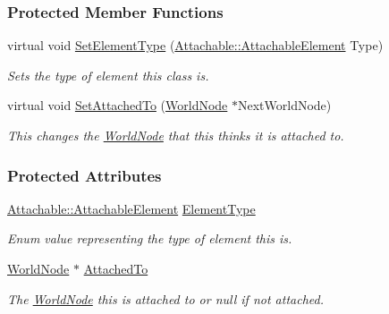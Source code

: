 \subsubsection*{Protected Member Functions}
\begin{DoxyCompactItemize}
\item 
virtual void \hyperlink{classphys_1_1Attachable_a74361315eba9e4f0ce288518c92541fa}{SetElementType} (\hyperlink{classphys_1_1Attachable_acd1fca033e7cc0bb3024a92d466d213a}{Attachable::AttachableElement} Type)
\begin{DoxyCompactList}\small\item\em Sets the type of element this class is. \item\end{DoxyCompactList}\item 
virtual void \hyperlink{classphys_1_1Attachable_a262c21d83f7d5a1bc96037fa59b7faaf}{SetAttachedTo} (\hyperlink{classphys_1_1WorldNode}{WorldNode} $\ast$NextWorldNode)
\begin{DoxyCompactList}\small\item\em This changes the \hyperlink{classphys_1_1WorldNode}{WorldNode} that this thinks it is attached to. \item\end{DoxyCompactList}\end{DoxyCompactItemize}
\subsubsection*{Protected Attributes}
\begin{DoxyCompactItemize}
\item 
\hyperlink{classphys_1_1Attachable_acd1fca033e7cc0bb3024a92d466d213a}{Attachable::AttachableElement} \hyperlink{classphys_1_1Attachable_af574d5f08a304c6e0ae002bb2fc057c7}{ElementType}
\begin{DoxyCompactList}\small\item\em Enum value representing the type of element this is. \item\end{DoxyCompactList}\item 
\hypertarget{classphys_1_1Attachable_af1009b5b9cfee1015079e8439182265e}{
\hyperlink{classphys_1_1WorldNode}{WorldNode} $\ast$ \hyperlink{classphys_1_1Attachable_af1009b5b9cfee1015079e8439182265e}{AttachedTo}}
\label{df/dbd/classphys_1_1Attachable_af1009b5b9cfee1015079e8439182265e}

\begin{DoxyCompactList}\small\item\em The \hyperlink{classphys_1_1WorldNode}{WorldNode} this is attached to or null if not attached. \item\end{DoxyCompactList}\end{DoxyCompactItemize}
